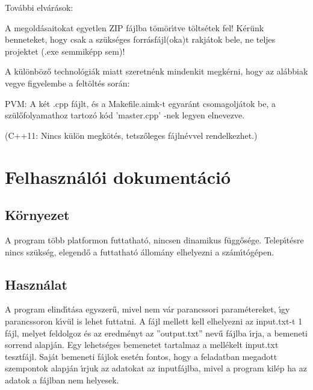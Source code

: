 \documentclass[10pt]{article}
\begin{document}
{\raggedright
	{\normalsize Tov\'{a}bbi elv\'{a}r\'{a}sok:}
}

{\normalsize A megold\'{a}saitokat egyetlen ZIP f\'{a}jlba
t\"{o}m\"{o}r\'{\i}tve t\"{o}lts\'{e}tek fel! K\'{e}r\"{u}nk benneteket, hogy
csak a sz\"{u}ks\'{e}ges forr\'{a}sf\'{a}jl(oka)t rakj\'{a}tok bele, ne teljes
projektet (.exe semmik\'{e}pp sem)!}

{\normalsize A k\"{u}l\"{o}nb\"{o}z\H{o} technol\'{o}gi\'{a}k miatt
szeretn\'{e}nk mindenkit megk\'{e}rni, hogy az al\'{a}bbiak vegye figyelembe a
felt\"{o}lt\'{e}s sor\'{a}n:}

{\raggedright
{\normalsize PVM: A k\'{e}t .cpp f\'{a}jlt, \'{e}s a Makefile.aimk-t
egyar\'{a}nt csomagolj\'{a}tok be, a sz\"{u}l\H{o}folyamathoz tartoz\'{o} k\'{o}d
'master.cpp' -nek legyen elnevezve.}
}

{\raggedright
{\normalsize (C++11: Nincs k\"{u}l\"{o}n megk\"{o}t\'{e}s, tetsz\H{o}leges
f\'{a}jln\'{e}vvel rendelkezhet.)}
}

\section{Felhaszn\'{a}l\'{o}i dokument\'{a}ci\'{o}}
\subsection{K\"{o}rnyezet}


A program t\"{o}bb platformon futtathat\'{o}, nincsen dinamikus
f\"{u}gg\H{o}s\'{e}ge. Telep\'{\i}t\'{e}sre nincs sz\"{u}ks\'{e}g, elegend\H{o} a
futtathat\'{o} \'{a}llom\'{a}ny elhelyezni a sz\'{a}m\'{\i}t\'{o}g\'{e}pen.

\subsection{Haszn\'{a}lat}

A program elind\'{\i}t\'{a}sa egyszer\H{u}, mivel nem v\'{a}r parancssori
param\'{e}tereket, \'{\i}gy parancssoron k\'{\i}v\"{u}l is lehet futtatni. A
f\'{a}jl mellett kell elhelyezni az input.txt-t 1 f\'{a}jl, melyet feldolgoz
\'{e}s az eredm\'{e}nyt az ''output.txt'' nev\H{u} f\'{a}jlba \'{\i}rja, a
bemeneti sorrend alapj\'{a}n. Egy lehets\'{e}ges bemenetet tartalmaz a
mell\'{e}kelt input.txt tesztf\'{a}jl. Saj\'{a}t bemeneti f\'{a}jlok eset\'{e}n
fontos, hogy a feladatban megadott szempontok alapj\'{a}n \'{\i}rjuk az adatokat
az inputf\'{a}jlba, mivel a program kil\'{e}p ha az adatok a f\'{a}jlban nem
helyesek.
\end{document}
